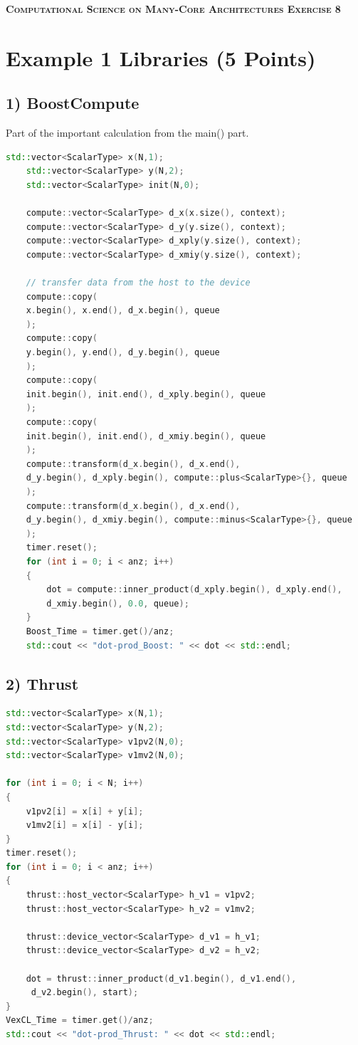 \documentclass[11pt,a4paper]{article}
\begin{document}
\begin{center}
	\fontsize{24pt}{10pt}\selectfont
	\textsc{\textbf{Computational Science on Many-Core Architectures  Exercise 8}}
\end{center}
\section*{Example 1 Libraries (5 Points)}
\subsection*{1) BoostCompute}
Part of the important calculation from the main() part.

\begin{lstlisting}[language=C++, caption={BoostCompute}]
	std::vector<ScalarType> x(N,1);
	std::vector<ScalarType> y(N,2);
	std::vector<ScalarType> init(N,0);
	
	compute::vector<ScalarType> d_x(x.size(), context);
	compute::vector<ScalarType> d_y(y.size(), context);
	compute::vector<ScalarType> d_xply(y.size(), context);
	compute::vector<ScalarType> d_xmiy(y.size(), context);
	
	// transfer data from the host to the device
	compute::copy(
	x.begin(), x.end(), d_x.begin(), queue
	);
	compute::copy(
	y.begin(), y.end(), d_y.begin(), queue
	);
	compute::copy(
	init.begin(), init.end(), d_xply.begin(), queue
	);
	compute::copy(
	init.begin(), init.end(), d_xmiy.begin(), queue
	);
	compute::transform(d_x.begin(), d_x.end(), 
	d_y.begin(), d_xply.begin(), compute::plus<ScalarType>{}, queue
	);
	compute::transform(d_x.begin(), d_x.end(), 
	d_y.begin(), d_xmiy.begin(), compute::minus<ScalarType>{}, queue
	);
	timer.reset();
	for (int i = 0; i < anz; i++)
	{
		dot = compute::inner_product(d_xply.begin(), d_xply.end(), 
		d_xmiy.begin(), 0.0, queue);
	}
	Boost_Time = timer.get()/anz;
	std::cout << "dot-prod_Boost: " << dot << std::endl;
\end{lstlisting}
\newpage
\subsection*{2) Thrust}
\begin{lstlisting}[language=C++, caption={Thrust}]
std::vector<ScalarType> x(N,1);
std::vector<ScalarType> y(N,2);
std::vector<ScalarType> v1pv2(N,0);
std::vector<ScalarType> v1mv2(N,0);

for (int i = 0; i < N; i++)
{
	v1pv2[i] = x[i] + y[i];
	v1mv2[i] = x[i] - y[i];
}
timer.reset();
for (int i = 0; i < anz; i++)
{
	thrust::host_vector<ScalarType> h_v1 = v1pv2;
	thrust::host_vector<ScalarType> h_v2 = v1mv2;
	
	thrust::device_vector<ScalarType> d_v1 = h_v1;
	thrust::device_vector<ScalarType> d_v2 = h_v2;
	
	dot = thrust::inner_product(d_v1.begin(), d_v1.end(),
	 d_v2.begin(), start);
}
VexCL_Time = timer.get()/anz;
std::cout << "dot-prod_Thrust: " << dot << std::endl;
\end{lstlisting}
\end{document}
